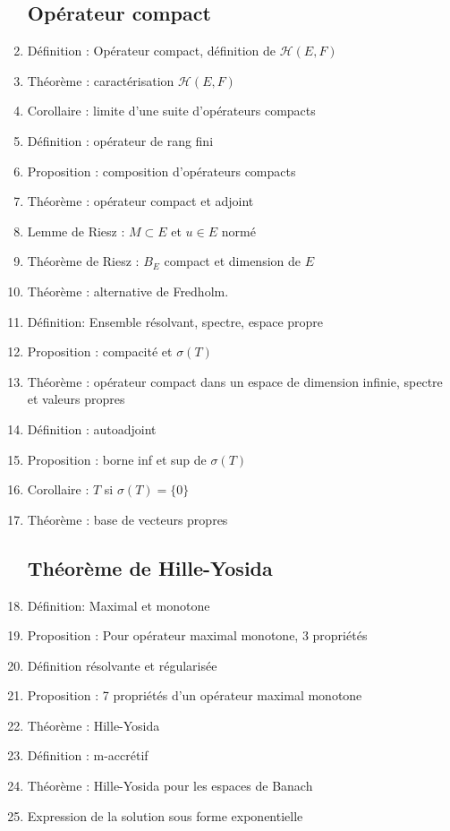 \documentclass{article}
\begin{document}
\begin{enumerate}
\subsection{Opérateur compact}
	\item Définition : Opérateur compact, définition de $\mathscr{H}(E,F)$
	\item Théorème : caractérisation $\mathscr{H}(E,F)$
	\item Corollaire : limite d'une suite d'opérateurs compacts
	\item Définition : opérateur de rang fini
	\item Proposition : composition d'opérateurs compacts
	\item Théorème : opérateur compact et adjoint
	\item Lemme de Riesz : $M\subset E$ et $u\in E$ normé
	\item Théorème de Riesz : $B_E$ compact et dimension de $E$
	\item Théorème : alternative de Fredholm.
	\item Définition: Ensemble résolvant, spectre, espace propre
	\item Proposition : compacité et $\sigma(T)$
	\item Théorème : opérateur compact dans un espace de dimension infinie, spectre et valeurs propres
	\item Définition : autoadjoint
	\item Proposition : borne inf et sup de $\sigma(T)$
	\item Corollaire : $T$ si $\sigma(T)=\{0\}$
	\item Théorème : base de vecteurs propres
\subsection{Théorème de Hille-Yosida}
	\item Définition: Maximal et monotone
	\item Proposition : Pour opérateur maximal monotone, 3 propriétés
	\item Définition résolvante et régularisée
	\item Proposition : 7 propriétés d'un opérateur maximal monotone
	\item Théorème : Hille-Yosida
	\item Définition : m-accrétif
	\item Théorème : Hille-Yosida pour les espaces de Banach
	\item Expression de la solution sous forme exponentielle

\end{enumerate}
\end{document}
